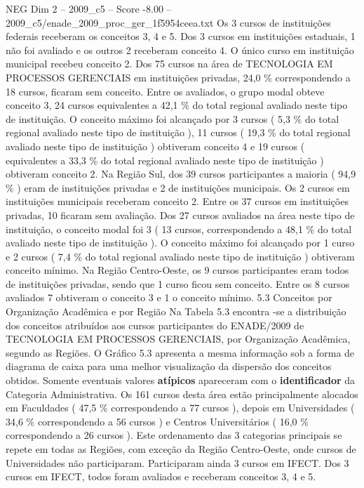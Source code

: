 \begin{textsample}{NEG Dim 2 – 2009\_c5 – Score -8.00 – 2009\_c5/enade\_2009\_proc\_ger\_1f5954ceea.txt}
Os 3 cursos de instituições federais receberam os conceitos 3, 4 e 5.
Dos 3 cursos em instituições estaduais, 1 não foi avaliado e os outros 2 receberam conceito 4.
O único curso em instituição municipal recebeu conceito 2.
Dos 75 cursos na área de TECNOLOGIA EM PROCESSOS GERENCIAIS em instituições privadas, 24,0 \% correspondendo a 18 cursos, ficaram sem conceito.
Entre os avaliados, o grupo modal obteve conceito 3, 24 cursos equivalentes a 42,1 \% do total regional avaliado neste tipo de instituição.
O conceito máximo foi alcançado por 3 cursos ( 5,3 \% do total regional avaliado neste tipo de instituição ), 11 cursos ( 19,3 \% do total regional avaliado neste tipo de instituição ) obtiveram conceito 4 e 19 cursos ( equivalentes a 33,3 \% do total regional avaliado neste tipo de instituição ) obtiveram conceito 2.
Na Região Sul, dos 39 cursos participantes a maioria ( 94,9 \% ) eram de instituições privadas e 2 de instituições municipais.
Os 2 cursos em instituições municipais receberam conceito 2.
Entre os 37 cursos em instituições privadas, 10 ficaram sem avaliação.
Dos 27 cursos avaliados na área neste tipo de instituição, o conceito modal foi 3 ( 13 cursos, correspondendo a 48,1 \% do total avaliado neste tipo de instituição ).
O conceito máximo foi alcançado por 1 curso e 2 cursos ( 7,4 \% do total regional avaliado neste tipo de instituição ) obtiveram conceito mínimo.
Na Região Centro-Oeste, os 9 cursos participantes eram todos de instituições privadas, sendo que 1 curso ficou sem conceito.
Entre os 8 cursos avaliados 7 obtiveram o conceito 3 e 1 o conceito mínimo. 5.3 Conceitos por Organização Acadêmica e por Região Na Tabela 5.3 encontra -se a distribuição dos conceitos atribuídos aos cursos participantes do ENADE/2009 de TECNOLOGIA EM PROCESSOS GERENCIAIS, por Organização Acadêmica, segundo as Regiões.
O Gráfico 5.3 apresenta a mesma informação sob a forma de diagrama de caixa para uma melhor visualização da dispersão dos conceitos obtidos.
Somente eventuais valores \textbf{atípicos} apareceram com o \textbf{identificador} da Categoria Administrativa.
Os 161 cursos desta área estão principalmente alocados em Faculdades ( 47,5 \% correspondendo a 77 cursos ), depois em Universidades ( 34,6 \% correspondendo a 56 cursos ) e Centros Universitários ( 16,0 \% correspondendo a 26 cursos ).
Este ordenamento das 3 categorias principais se repete em todas as Regiões, com exceção da Região Centro-Oeste, onde cursos de Universidades não participaram.
Participaram ainda 3 cursos em IFECT.
Dos 3 cursos em IFECT, todos foram avaliados e receberam conceitos 3, 4 e 5.

\end{textsample}
